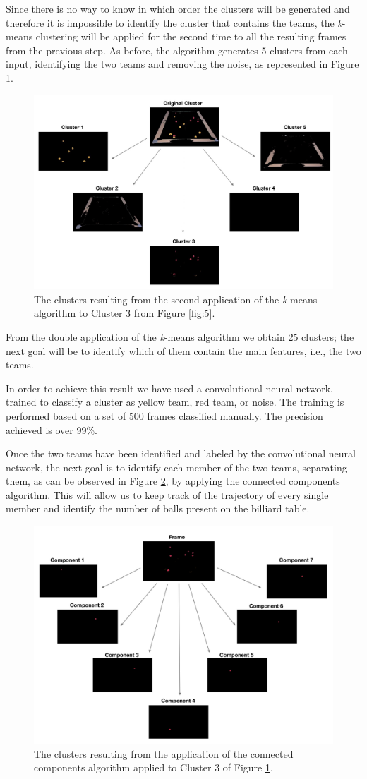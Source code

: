 \documentclass{usiinftr}
\begin{document}
Since there is no way to know in which order the clusters will be generated and therefore it is impossible to identify the cluster that contains the teams, the \textit{k}-means clustering will be applied for the second time to all the resulting frames from the previous step. As before, the algorithm generates 5 clusters from each input, identifying the two teams and removing the noise, as represented in  Figure \ref{fig:6}.

\begin{figure}[h]
	\centering
	\includegraphics[width=0.7\linewidth]{./img/clusters2}
	\caption{The clusters resulting from the second application of the \textit{k}-means algorithm to Cluster 3 from Figure \ref{fig:5}.}
	\label{fig:6}
\end{figure}

From the double application of the \textit{k}-means algorithm we obtain 25 clusters; the next goal will be to identify which of them contain the main features, i.e., the two teams.

In order to achieve this result we have used a convolutional neural network, trained to classify a cluster as yellow team, red team, or noise. The training is performed based on a set of 500 frames classified manually. The precision achieved is over 99\%.

Once the two teams have been identified and labeled by the convolutional neural network, the next goal is to identify each member of the two teams, separating them, as can be observed in Figure \ref{fig:7}, by applying the connected components algorithm. This will allow us to keep track of the trajectory of every single member and identify the number of balls present on the billiard table.
\begin{figure}[h]
	\centering
	\includegraphics[width=0.7\linewidth]{./img/cc}
	\caption{The clusters resulting from the application of the connected components algorithm applied to Cluster 3 of Figure \ref{fig:6}.}
	\label{fig:7}
\end{figure}
\end{document}
